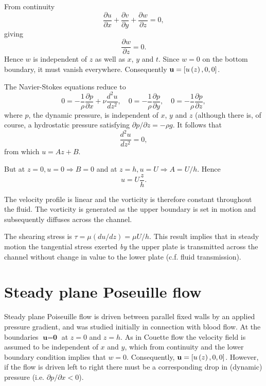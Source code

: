 \documentclass[twoside,a4paper,11pt]{report}
\begin{document}
From continuity 
\[\frac{\partial u}{\partial x}+\frac{\partial 
v}{\partial y}+\frac{\partial w}{\partial z}=0, \]
giving 
\[\frac{\partial w}{\partial z}=0.\]
Hence $w$ is independent of $z$ as well as $x$, $y$ and $t$. Since $w = 0$ on the bottom 
boundary, it must vanish everywhere. Consequently ${{\bf u}}=\left[ 
{u\left( z \right),0,0} \right]$.

The Navier-Stokes equations reduce to
\[
0=-\frac{1}{\rho }\frac{\partial p}{\partial x}+\nu 
\frac{d^2u}{dz^2},\quad 0=-\frac{1}{\rho }\frac{\partial 
p}{\partial y},\quad 0=-\frac{1}{\rho }\frac{\partial 
p}{\partial z},
\]
where $p$, the dynamic pressure, is independent of $x$, $y$ and $z$ (although there 
is, of course, a hydrostatic pressure satisfying ${\partial p} /{\partial z}=-\rho g$. It follows that 
\[
\frac{d^2u}{dz^2}=0,
\]
from which $u=Az+B$.

But at $z=0,u=0\Rightarrow 
B=0$ and at $z=h,u=U\Rightarrow 
A=U/h$.
Hence 
\[ u=U\frac{z}{h}. \]

The velocity profile is linear and the vorticity is therefore constant 
throughout the fluid. The vorticity is generated as the upper boundary is 
set in motion and subsequently diffuses across the channel. 

The shearing stress is $\tau =\mu \left( {{du} /{dz}} 
\right)=\mu U / h$. This result implies that in steady motion 
the tangential stress exerted \textit{by} the upper plate is transmitted across the 
channel without change in value to the lower plate (c.f. fluid transmission).

\section{Steady plane Poseuille flow}
Steady plane Poiseuille flow is driven between parallel fixed walls by an 
applied pressure gradient, and was studied initially in connection with 
blood flow. At the boundaries $\textbf{u} = \textbf{0}$ at $z = 0$ and $z = h$. As 
in Couette flow the velocity field is assumed to be independent of $x$ and $y$, 
which from continuity and the lower boundary condition implies that $w = 0$. 
Consequently, ${{\bf u}}=\left[ {u\left( z \right),0,0} \right]$. 
However, if the flow is driven left to right there must be a corresponding 
drop in (dynamic) pressure (i.e. $\partial p/\partial x <0$).
\end{document}

